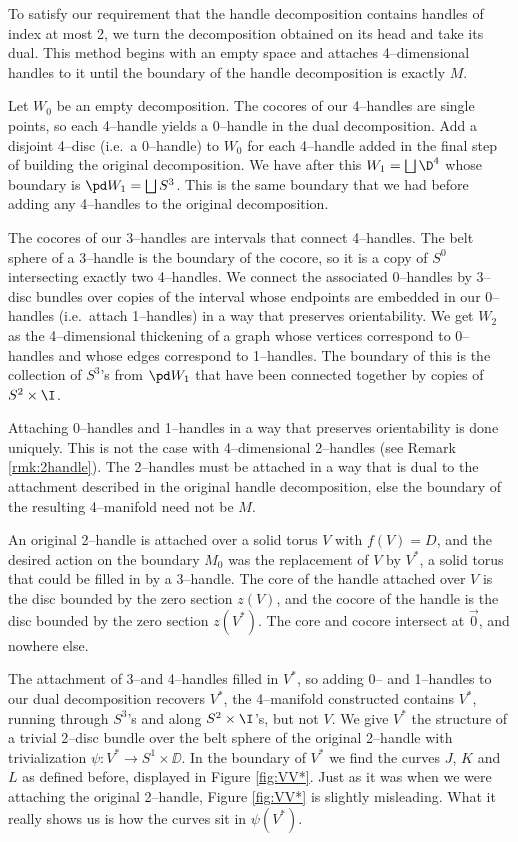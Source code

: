 	To satisfy our requirement that the handle decomposition contains handles of index at most 2, we turn the decomposition obtained on its head and take its dual.
	This method begins with an empty space and attaches 4--dimensional handles to it until the boundary of the handle decomposition is exactly $M$.
	
	Let $W_0$ be an empty decomposition.
	The cocores of our 4--handles are single points, so each 4--handle yields a 0--handle in the dual decomposition.
	Add a disjoint 4--disc (i.e.\ a 0--handle) to $W_0$ for each 4--handle added in the final step of building the original decomposition.
	We have after this $W_1=\bigsqcup \D^4$ whose boundary is $\pd W_1 = \bigsqcup S^3$.
	This is the same boundary that we had before adding any 4--handles to the original decomposition.
	
	The cocores of our 3--handles are intervals that connect 4--handles.
	The belt sphere of a 3--handle is the boundary of the cocore, so it is a copy of $S^0$ intersecting exactly two 4--handles.
	We connect the associated 0--handles by 3--disc bundles over copies of the interval whose endpoints are embedded in our 0--handles (i.e.\ attach 1--handles) in a way that preserves orientability.
	We get $W_2$ as the 4--dimensional thickening of a graph whose vertices correspond to 0--handles and whose edges correspond to 1--handles.
	The boundary of this is the collection of $S^3$'s from $\pd W_1$ that have been connected together by copies of $S^2\times\I$.

	Attaching 0--handles and 1--handles in a way that preserves orientability is done uniquely.
	This is not the case with 4--dimensional 2--handles (see Remark \ref{rmk:2handle}).
	The 2--handles must be attached in a way that is dual to the attachment described in the original handle decomposition, else the boundary of the resulting 4--manifold need not be $M$.
	
	An original 2--handle is attached over a solid torus $V$ with $f(V)=D$, and the desired action on the boundary $M_0$ was the replacement of $V$ by $V^*$, a solid torus that could be filled in by a 3--handle.
	The core of the handle attached over $V$ is the disc bounded by the zero section $z(V)$, and the cocore of the handle is the disc bounded by the zero section $z(V^*)$.
	The core and cocore intersect at $\vec{0}$, and nowhere else.
	
	The attachment of 3--and 4--handles filled in $V^*$, so adding 0-- and 1--handles to our dual decomposition recovers $V^*$, the 4--manifold constructed contains $V^*$, running through $S^3$'s and along $S^2\times\I$'s, but not $V$.
	We give $V^*$ the structure of a trivial 2--disc bundle over the belt sphere of the original 2--handle with trivialization $\psi:V^*\to S^1\times\DD$.
	In the boundary of $V^*$ we find the curves $J$, $K$ and $L$ as defined before, displayed in Figure \ref{fig:VV*}.
	Just as it was when we were attaching the original 2--handle, Figure \ref{fig:VV*} is slightly misleading.
	What it really shows us is how the curves sit in $\psi(V^*)$.
	
